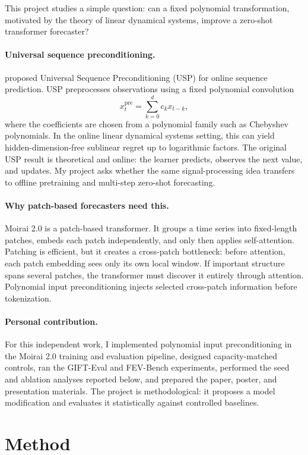 \documentclass[11pt]{article}
\begin{document}
This project studies a simple question: can a fixed polynomial transformation, motivated by the theory of linear dynamical systems, improve a zero-shot transformer forecaster?

\paragraph{Universal sequence preconditioning.}
\citet{marsden2024universal} proposed Universal Sequence Preconditioning (USP) for online sequence prediction. USP preprocesses observations using a fixed polynomial convolution
\[
  x_t^{\mathrm{pre}}=\sum_{k=0}^{d} c_k x_{t-k},
\]
where the coefficients are chosen from a polynomial family such as Chebyshev polynomials. In the online linear dynamical systems setting, this can yield hidden-dimension-free sublinear regret up to logarithmic factors. The original USP result is theoretical and online: the learner predicts, observes the next value, and updates. My project asks whether the same signal-processing idea transfers to offline pretraining and multi-step zero-shot forecasting.

\paragraph{Why patch-based forecasters need this.}
Moirai 2.0 is a patch-based transformer. It groups a time series into fixed-length patches, embeds each patch independently, and only then applies self-attention. Patching is efficient, but it creates a cross-patch bottleneck: before attention, each patch embedding sees only its own local window. If important structure spans several patches, the transformer must discover it entirely through attention. Polynomial input preconditioning injects selected cross-patch information before tokenization.

\paragraph{Personal contribution.}
For this independent work, I implemented polynomial input preconditioning in the Moirai 2.0 training and evaluation pipeline, designed capacity-matched controls, ran the GIFT-Eval and FEV-Bench experiments, performed the seed and ablation analyses reported below, and prepared the paper, poster, and presentation materials. The project is methodological: it proposes a model modification and evaluates it statistically against controlled baselines.

\section{Method}
\end{document}

